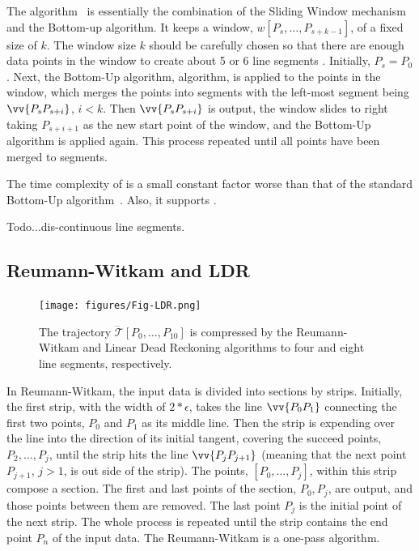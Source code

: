 {The \swab algorithm~\cite{Keogh:online} is essentially the combination of the Sliding Window mechanism and the Bottom-up algorithm.
It keeps a window, $w[P_s, \ldots, P_{s+k-1}]$, of a fixed size of $k$.
The window size $k$ should be carefully chosen so that there are enough data points in the window to create about 5 or 6 line segments \cite{Keogh:online}.
Initially, $P_s=P_0$.
Next, the Bottom-Up algorithm, \eg \pavlidis algorithm, is applied to the points in the window, which merges the points into segments with the left-most segment being $\vv{P_sP_{s+i}}$, $i<k$.
Then $\vv{P_sP_{s+i}}$ is output, the window slides to right taking $P_{s+i+1}$ as the new start point of the window, and the Bottom-Up algorithm is applied again.
This process repeated until all points have been merged to segments.

The time complexity of \swab is a small constant factor worse than that of the standard Bottom-Up algorithm~\cite{Keogh:online}.
Also, it supports \sed. %

\textcolor[rgb]{1.00,0.00,0.00}{Todo...dis-continuous line segments.}






\subsection{Reumann-Witkam and LDR}

\begin{figure}[tb!]
\centering
\texttt{[image: figures/Fig-LDR.png]}
\vspace{-1ex}
\caption{\small The trajectory $\dddot{\mathcal{T}}[P_0, \ldots, P_{10}]$ is compressed by the Reumann-Witkam and Linear Dead Reckoning algorithms to four and eight line segments, respectively.}
\vspace{-2ex}
\label{fig:ldr}
\end{figure}

In Reumann-Witkam\cite{Reumann:Strip}, the input data is divided into sections by strips.
Initially, the first strip, with the width of $2*\epsilon$, takes the line $\vv{P_0P_1}$ connecting the first two points, $P_0$ and $P_1$ as its middle line.
Then the strip is expending over the line into the direction of its initial tangent, covering the succeed points, $P_2, \ldots, P_{j}$, until the strip hits the line $\vv{P_jP_{j+1}}$ (meaning that the next point $P_{j+1}$, $j>1$, is out side of the strip).
The points, $[P_0, \ldots, P_{j}]$, within this strip compose a section. The first and last points of the section, \ie $P_0,P_{j}$, are output, and those points between them are removed.
The last point $P_{j}$ is the initial point of the next strip.
The whole process is repeated until the strip contains the end point $P_n$ of the input data.
The Reumann-Witkam is a one-pass algorithm.

}
